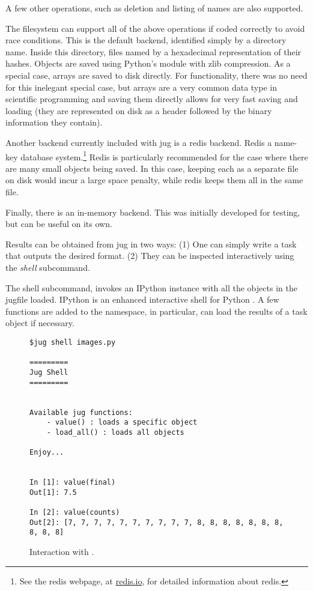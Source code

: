 \documentclass{article}
\begin{document}
A few other operations, such as deletion and listing of names are also
supported.

The filesystem can support all of the above operations if coded correctly to
avoid race conditions. This is the default backend, identified simply by a
directory name. Inside this directory, files named by a hexadecimal
representation of their hashes. Objects are saved using Python's 
module with zlib compression. As a special case,  arrays are saved
to disk directly. For functionality, there was no need for this inelegant
special case, but  arrays are a very common data type in scientific
programming and saving them directly allows for very fast saving and loading
(they are represented on disk as a header followed by the binary information
they contain).

Another backend currently included with jug is a redis backend. Redis a
name-key database system.\footnote{See the redis webpage, at
\href{http://redis.io}{redis.io}, for detailed information about redis.} Redis
is particularly recommended for the case where there are many small objects
being saved. In this case, keeping each as a separate file on disk would incur
a large space penalty, while redis keeps them all in the same file.

Finally, there is an in-memory backend. This was initially developed for
testing, but can be useful on its own.

Results can be obtained from jug in two ways: (1) One can simply write a task
that outputs the desired format. (2) They can be inspected interactively using
the \emph{shell} subcommand.

The shell subcommand, invokes an IPython instance with all the objects in the
jugfile loaded. IPython is an enhanced interactive shell for Python
\citep{Perez2007}. A few functions are added to the namespace, in particular,
 can load the results of a task object if necessary.

\begin{figure}
\begin{center}
\begin{verbatim}
$jug shell images.py

=========
Jug Shell
=========


Available jug functions:
    - value() : loads a specific object
    - load_all() : loads all objects

Enjoy...


In [1]: value(final)
Out[1]: 7.5

In [2]: value(counts)
Out[2]: [7, 7, 7, 7, 7, 7, 7, 7, 7, 7, 8, 8, 8, 8, 8, 8, 8, 8, 8, 8]
\end{verbatim}
\end{center}
\caption{Interaction with .}
\label{fig:jug-shell-interaction}
\end{figure}
\end{document}
